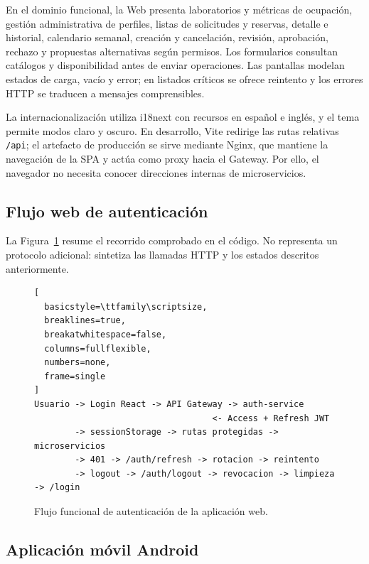 En el dominio funcional, la Web presenta laboratorios y métricas de ocupación,
gestión administrativa de perfiles, listas de solicitudes y reservas, detalle e
historial, calendario semanal, creación y cancelación, revisión, aprobación,
rechazo y propuestas alternativas según permisos. Los formularios consultan
catálogos y disponibilidad antes de enviar operaciones. Las pantallas modelan
estados de carga, vacío y error; en listados críticos se ofrece reintento y los
errores HTTP se traducen a mensajes comprensibles.

La internacionalización utiliza i18next con recursos en español e inglés, y el
tema permite modos claro y oscuro. En desarrollo, Vite redirige las rutas
relativas \texttt{/api}; el artefacto de producción se sirve mediante Nginx,
que mantiene la navegación de la SPA y actúa como proxy hacia el Gateway. Por
ello, el navegador no necesita conocer direcciones internas de microservicios.

\subsection{Flujo web de autenticación}
\label{subsec:flujo-auth-web}

La Figura~\ref{fig:flujo-auth-web} resume el recorrido comprobado en el código.
No representa un protocolo adicional: sintetiza las llamadas HTTP y los estados
descritos anteriormente.

\begin{figure}[ht]
  \centering
  \begin{minipage}{0.94\linewidth}
\begin{lstlisting}[
  basicstyle=\ttfamily\scriptsize,
  breaklines=true,
  breakatwhitespace=false,
  columns=fullflexible,
  numbers=none,
  frame=single
]
Usuario -> Login React -> API Gateway -> auth-service
                                   <- Access + Refresh JWT
        -> sessionStorage -> rutas protegidas -> microservicios
        -> 401 -> /auth/refresh -> rotacion -> reintento
        -> logout -> /auth/logout -> revocacion -> limpieza -> /login
\end{lstlisting}
  \end{minipage}
  \caption{Flujo funcional de autenticación de la aplicación web.}
  \label{fig:flujo-auth-web}
\end{figure}

\subsection{Aplicación móvil Android}
\label{subsec:aplicacion-mobile}

